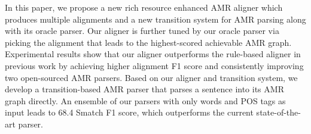 In this paper, we propose a new rich resource enhanced AMR aligner which produces multiple alignments and a new transition system for AMR parsing along with its oracle parser. Our aligner is further tuned by our oracle parser via picking the alignment that leads to the highest-scored achievable AMR graph. Experimental results show that our aligner outperforms the rule-based aligner in previous work by achieving higher alignment F1 score and consistently improving two open-sourced AMR parsers. Based on our aligner and transition system, we develop a transition-based AMR parser that parses a sentence into its AMR graph directly. An ensemble of our parsers with only words and POS tags as input leads to 68.4 Smatch F1 score, which outperforms the current state-of-the-art parser.
